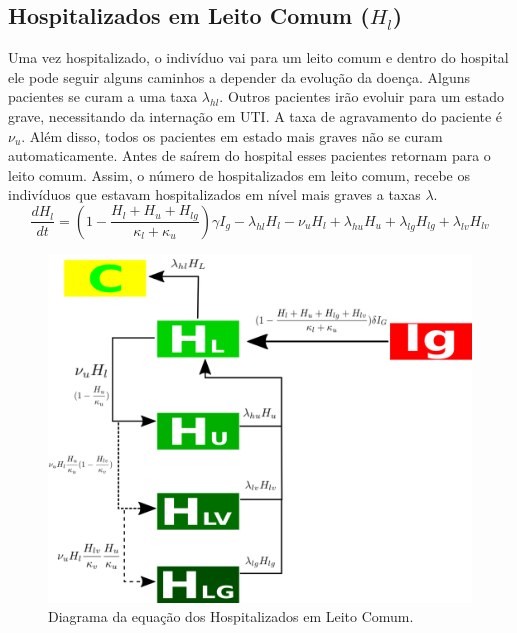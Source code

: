 \documentclass{article}
\begin{document}
\subsection{Hospitalizados em Leito Comum ($H_l$)}
Uma vez hospitalizado, o indivíduo vai para um leito comum e dentro do hospital ele pode seguir alguns caminhos a depender da evolução da doença. Alguns pacientes se curam a uma taxa $\lambda_{hl}$. Outros pacientes irão evoluir para um estado grave, necessitando da internação em UTI. A taxa de agravamento do paciente é $\nu_u$. Além disso, todos os pacientes em estado mais graves não se curam automaticamente. Antes de saírem do hospital esses pacientes retornam para o leito comum. Assim, o número de hospitalizados em leito comum, recebe os indivíduos que estavam hospitalizados em nível mais graves a taxas $\lambda$.
\begin{equation}
    \frac{dH_l}{dt}=(1-\frac{H_l+H_u+H_{lg}}{\kappa_l+\kappa_u})\gamma I_g - \lambda_{hl} H_l - \nu_uH_l + \lambda_{hu}H_u +\lambda_{lg}H_{lg} +\lambda_{lv}H_{lv}
\end{equation}
\begin{figure}[!h]
\centering
\includegraphics[scale=0.3]{covidHl}
\caption{Diagrama da equação dos Hospitalizados em Leito Comum.}
\label{fig:universe}
\end{figure}
\end{document}
